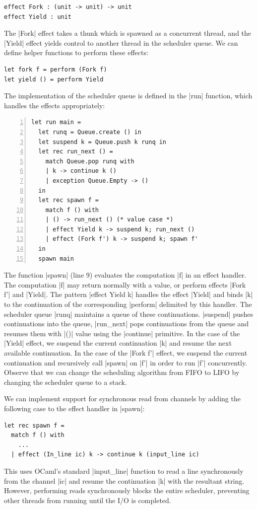 \documentclass[sigplan,screen]{acmart}
\begin{document}
\begin{lstlisting}
effect Fork : (unit -> unit) -> unit
effect Yield : unit
\end{lstlisting}

The |Fork| effect takes a thunk which is spawned as a concurrent thread, and
the |Yield| effect yields control to another thread in the scheduler queue. We
can define helper functions to perform these effects:

\begin{lstlisting}
let fork f = perform (Fork f)
let yield () = perform Yield
\end{lstlisting}

The implementation of the scheduler queue is defined in the |run| function,
which handles the effects appropriately:

\begin{lstlisting}[numbers=left]
let run main =
  let runq = Queue.create () in
  let suspend k = Queue.push k runq in
  let rec run_next () =
    match Queue.pop runq with
    | k -> continue k ()
    | exception Queue.Empty -> ()
  in
  let rec spawn f =
    match f () with
    | () -> run_next () (* value case *)
    | effect Yield k -> suspend k; run_next ()
    | effect (Fork f') k -> suspend k; spawn f'
  in
  spawn main
\end{lstlisting}

The function |spawn| (line 9) evaluates the computation |f| in an effect
handler. The computation |f| may return normally with a value, or perform
effects |Fork f'| and |Yield|. The pattern |effect Yield k| handles the effect
|Yield| and binds |k| to the continuation of the corresponding |perform|
delimited by this handler. The scheduler queue |runq| maintains a queue of
these continuations. |suspend| pushes continuations into the queue, |run_next|
pops continuations from the queue and resumes them with |()| value using the
|continue| primitive. In the case of the |Yield| effect, we suspend the current
continuation |k| and resume the next available continuation. In the case of the
|Fork f'| effect, we suspend the current continuation and recursively call
|spawn| on |f'| in order to run |f'| concurrently. Observe that we can change
the scheduling algorithm from FIFO to LIFO by changing the scheduler queue to a
stack.

We can implement support for synchronous read from channels by adding the
following case to the effect handler in |spawn|:

\begin{lstlisting}
let rec spawn f =
  match f () with
	...
  | effect (In_line ic) k -> continue k (input_line ic)
\end{lstlisting}
%
This uses OCaml's standard |input_line| function to read a line
synchronously from the channel |ic| and resume the continuation |k| with the
resultant string. However, performing reads synchronously blocks the entire
scheduler, preventing other threads from running until the I/O is completed.
\end{document}
